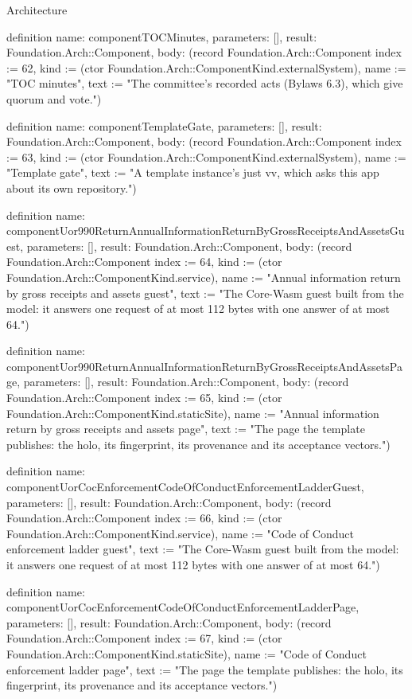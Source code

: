 \begin{lexlean}{Architecture}
\begin{semanticmodule}
definition{
  name: componentTOCMinutes,
  parameters: [],
  result: Foundation.Arch::Component,
  body: (record Foundation.Arch::Component {index := 62, kind := (ctor Foundation.Arch::ComponentKind.externalSystem), name := "TOC minutes", text := "The committee's recorded acts (Bylaws 6.3), which give quorum and vote."})
}

definition{
  name: componentTemplateGate,
  parameters: [],
  result: Foundation.Arch::Component,
  body: (record Foundation.Arch::Component {index := 63, kind := (ctor Foundation.Arch::ComponentKind.externalSystem), name := "Template gate", text := "A template instance's just vv, which asks this app about its own repository."})
}

definition{
  name: componentUor990ReturnAnnualInformationReturnByGrossReceiptsAndAssetsGuest,
  parameters: [],
  result: Foundation.Arch::Component,
  body: (record Foundation.Arch::Component {index := 64, kind := (ctor Foundation.Arch::ComponentKind.service), name := "Annual information return by gross receipts and assets guest", text := "The Core-Wasm guest built from the model: it answers one request of at most 112 bytes with one answer of at most 64."})
}

definition{
  name: componentUor990ReturnAnnualInformationReturnByGrossReceiptsAndAssetsPage,
  parameters: [],
  result: Foundation.Arch::Component,
  body: (record Foundation.Arch::Component {index := 65, kind := (ctor Foundation.Arch::ComponentKind.staticSite), name := "Annual information return by gross receipts and assets page", text := "The page the template publishes: the holo, its fingerprint, its provenance and its acceptance vectors."})
}

definition{
  name: componentUorCocEnforcementCodeOfConductEnforcementLadderGuest,
  parameters: [],
  result: Foundation.Arch::Component,
  body: (record Foundation.Arch::Component {index := 66, kind := (ctor Foundation.Arch::ComponentKind.service), name := "Code of Conduct enforcement ladder guest", text := "The Core-Wasm guest built from the model: it answers one request of at most 112 bytes with one answer of at most 64."})
}

definition{
  name: componentUorCocEnforcementCodeOfConductEnforcementLadderPage,
  parameters: [],
  result: Foundation.Arch::Component,
  body: (record Foundation.Arch::Component {index := 67, kind := (ctor Foundation.Arch::ComponentKind.staticSite), name := "Code of Conduct enforcement ladder page", text := "The page the template publishes: the holo, its fingerprint, its provenance and its acceptance vectors."})
}


\end{semanticmodule}
\end{lexlean}
